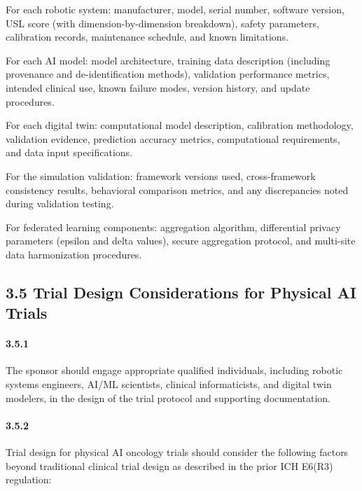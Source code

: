 \begin{description}[leftmargin=2.5cm,style=sameline]

\item[(a)] For each robotic system: manufacturer, model, serial number, software version, USL score (with dimension-by-dimension breakdown), safety parameters, calibration records, maintenance schedule, and known limitations.

\item[(b)] For each AI model: model architecture, training data description (including provenance and de-identification methods), validation performance metrics, intended clinical use, known failure modes, version history, and update procedures.

\item[(c)] For each digital twin: computational model description, calibration methodology, validation evidence, prediction accuracy metrics, computational requirements, and data input specifications.

\item[(d)] For the simulation validation: framework versions used, cross-framework consistency results, behavioral comparison metrics, and any discrepancies noted during validation testing.

\item[(e)] For federated learning components: aggregation algorithm, differential privacy parameters (epsilon and delta values), secure aggregation protocol, and multi-site data harmonization procedures.

\end{description}

\subsection{3.5 Trial Design Considerations for Physical AI Trials}

\paragraph{3.5.1} The sponsor should engage appropriate qualified individuals, including robotic systems engineers, AI/ML scientists, clinical informaticists, and digital twin modelers, in the design of the trial protocol and supporting documentation.

\paragraph{3.5.2} Trial design for physical AI oncology trials should consider the following factors beyond traditional clinical trial design as described in the prior ICH E6(R3) regulation:

